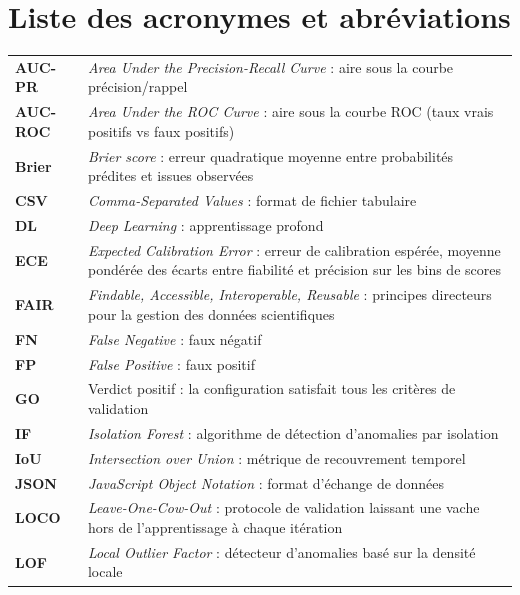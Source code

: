 \chapter*{Liste des acronymes et abréviations}

\begin{longtable}{@{}lp{11cm}@{}}
\textbf{AUC-PR}  & \textit{Area Under the Precision-Recall Curve} : aire sous la courbe précision/rappel \\[3pt]
\textbf{AUC-ROC} & \textit{Area Under the ROC Curve} : aire sous la courbe ROC (taux vrais positifs vs faux positifs) \\[3pt]
\textbf{Brier}   & \textit{Brier score} : erreur quadratique moyenne entre probabilités prédites et issues observées \\[3pt]
\textbf{CSV}     & \textit{Comma-Separated Values} : format de fichier tabulaire \\[3pt]
\textbf{DL}      & \textit{Deep Learning} : apprentissage profond \\[3pt]
\textbf{ECE}     & \textit{Expected Calibration Error} : erreur de calibration espérée, moyenne pondérée des écarts entre fiabilité et précision sur les bins de scores \\[3pt]
\textbf{FAIR}    & \textit{Findable, Accessible, Interoperable, Reusable} : principes directeurs pour la gestion des données scientifiques \\[3pt]
\textbf{FN}      & \textit{False Negative} : faux négatif \\[3pt]
\textbf{FP}      & \textit{False Positive} : faux positif \\[3pt]
\textbf{GO}      & Verdict positif : la configuration satisfait tous les critères de validation \\[3pt]
\textbf{IF}      & \textit{Isolation Forest} : algorithme de détection d'anomalies par isolation \\[3pt]
\textbf{IoU}     & \textit{Intersection over Union} : métrique de recouvrement temporel \\[3pt]
\textbf{JSON}    & \textit{JavaScript Object Notation} : format d'échange de données \\[3pt]
\textbf{LOCO}    & \textit{Leave-One-Cow-Out} : protocole de validation laissant une vache hors de l'apprentissage à chaque itération \\[3pt]
\textbf{LOF}     & \textit{Local Outlier Factor} : détecteur d'anomalies basé sur la densité locale \\[3pt]

\end{longtable}
